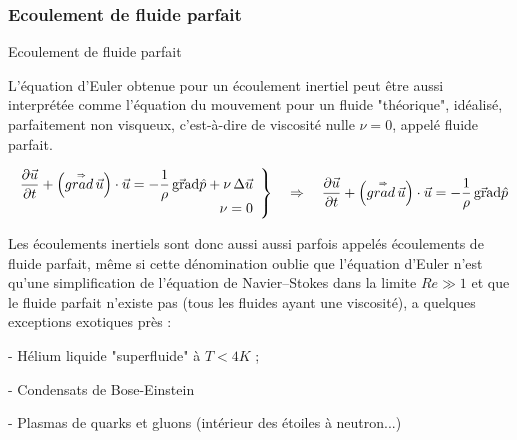 \subsubsection{Ecoulement de fluide parfait}
\begin{frame}{Ecoulement de fluide parfait}

\small

L'équation d'Euler obtenue pour un écoulement inertiel peut être aussi interprétée comme 
l'équation du mouvement pour un fluide "théorique", idéalisé, parfaitement non visqueux, 
c'est-à-dire de viscosité nulle $\nu=0$, appelé \textcolor{vert}{fluide parfait}.

\begin{minipage}{90mm}
\[
	\left .
	\begin{array}{r}
	\displaystyle \frac{\partial \vec{u}}{\partial t} + \left( \accentset{\Rightarrow}{grad} \, \vec{u} \right) \cdot \vec{u}
  =
  - \frac{1}{\rho} \, \vec{\mbox{\rm gra}}\mbox{\rm d} \hat{p} 
  + \nu \, \Delta \vec{u}
  \\
  \nu = 0
  \end{array}
  \right \} 
  \quad \Rightarrow \quad 
	\displaystyle \frac{\partial \vec{u}}{\partial t} + \left( \accentset{\Rightarrow}{grad} \, \vec{u} \right) \cdot \vec{u}
  =
  - \frac{1}{\rho} \, \vec{\mbox{\rm gra}}\mbox{\rm d}{\hat{p}} 
\]
\end{minipage}

\bigskip
\pause

Les écoulements inertiels sont donc aussi aussi parfois appelés 
\textcolor{vert}{écoulements de fluide parfait}, même si cette dénomination 
oublie que l'équation d'Euler n'est qu'une simplification de l'équation de Navier--Stokes
dans la limite $Re\gg 1$ et que le fluide parfait n'existe pas 
(tous les fluides ayant une viscosité), a quelques exceptions exotiques près :

- Hélium liquide "superfluide" à $T<4K$ ;

- Condensats de Bose-Einstein

- Plasmas de quarks et gluons (intérieur des étoiles à neutron...)

%


\end{frame}
